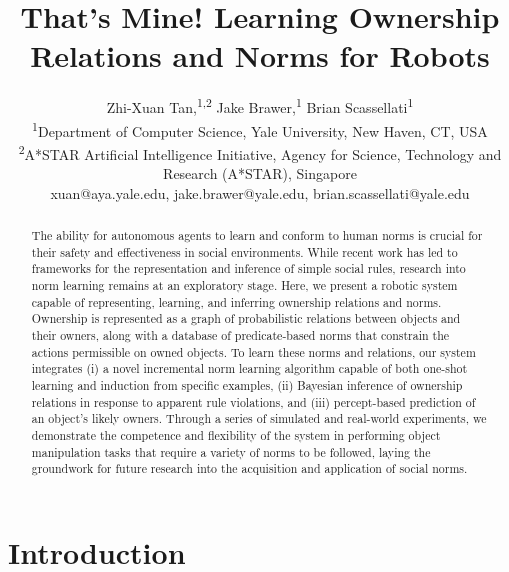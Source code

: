 \documentclass[letterpaper]{article} %
\begin{document}
%
\title{That's Mine! Learning Ownership Relations and Norms for Robots}
\author{Zhi-Xuan Tan,\textsuperscript{1,2}
Jake Brawer,\textsuperscript{1}
Brian Scassellati\textsuperscript{1}\\
\textsuperscript{1}{Department of Computer Science, Yale University, New Haven, CT, USA}\\
\textsuperscript{2}{A*STAR Artificial Intelligence Initiative, Agency for Science, Technology and Research (A*STAR), Singapore}\\
xuan@aya.yale.edu, jake.brawer@yale.edu, brian.scassellati@yale.edu}

\maketitle
\begin{abstract}
The ability for autonomous agents to learn and conform to human norms is crucial for their safety and effectiveness in social environments. While recent work has led to frameworks for the representation and inference of simple social rules, research into norm learning remains at an exploratory stage. Here, we present a robotic system capable of representing, learning, and inferring ownership relations and norms. Ownership is represented as a graph of probabilistic relations between objects and their owners, along with a database of predicate-based norms that constrain the actions permissible on owned objects. To learn these norms and relations, our system integrates (i) a novel incremental norm learning algorithm capable of both one-shot learning and induction from specific examples, (ii) Bayesian inference of ownership relations in response to apparent rule violations, and (iii) percept-based prediction of an object's likely owners. Through a series of simulated and real-world experiments, we demonstrate the competence and flexibility of the system in performing object manipulation tasks that require a variety of norms to be followed, laying the groundwork for future research into the acquisition and application of social norms. 
\end{abstract}

\section{Introduction}
\end{document}
